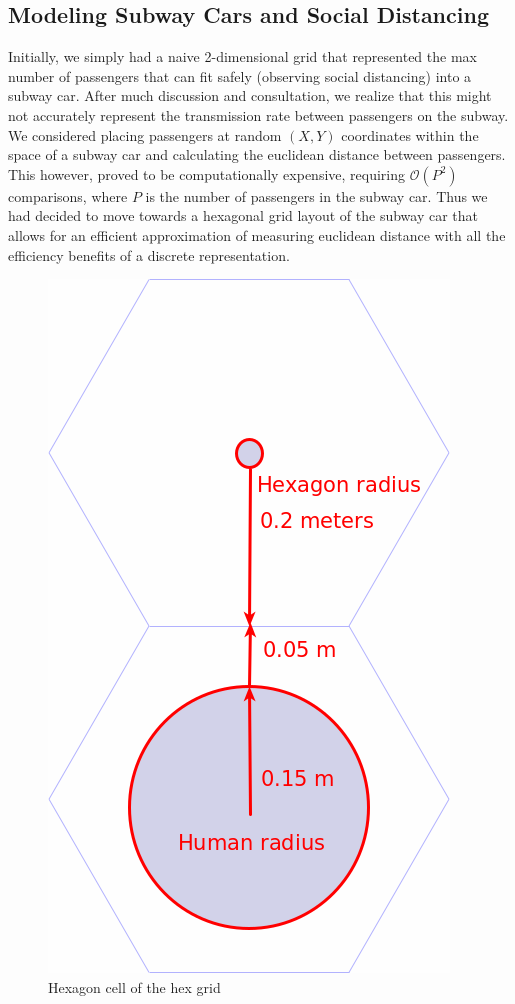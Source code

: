 \documentclass[12pt]{article}
\begin{document}
\subsection{Modeling Subway Cars and Social Distancing}
Initially, we simply had a naive 2-dimensional grid that represented the max number of passengers that can fit safely (observing social distancing) into a subway car.
After much discussion and consultation, we realize that this might not accurately represent the transmission rate between passengers on the subway. We considered placing passengers at random $(X,Y)$ coordinates within the space of a subway car and calculating the euclidean distance between passengers.
This however, proved to be computationally expensive, requiring $\mathcal{O}(P^2)$ comparisons, where $P$ is the number of passengers in the subway car.
Thus we had decided to move towards a hexagonal grid layout of the subway car that allows for an efficient approximation of measuring euclidean distance with all the efficiency benefits of a discrete representation.

\begin{figure}[h]
	\centering
	\includegraphics[scale=.30]{./figures/two-hex2.png}
	\caption{Hexagon cell of the hex grid}
	\label{hex-cell-pic}
\end{figure}
\end{document}

